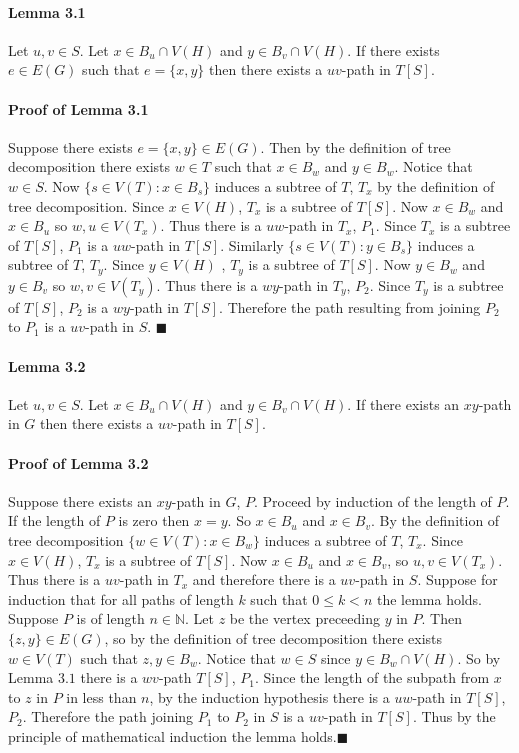 \documentclass[letterpaper,12pt,oneside,onecolumn]{report}
\begin{document}
\paragraph{Lemma 3.1}
Let $u, v \in S$. Let $x \in B_u \cap V(H)$ and $y \in B_v \cap V(H)$. If there exists $e \in E(G)$ such that $e = \{x,y\}$ then there exists a $uv$-path in $T[S]$.
\paragraph{Proof of Lemma 3.1}
Suppose there exists $e=\{x,y\} \in E(G)$. Then by the definition of tree decomposition there exists $w \in T$ such that $x \in B_w$ and $y \in B_w$. Notice that $w \in S$. Now $\{ s \in V(T) : x \in B_s \}$ induces a subtree of $T$, $T_x$ by the definition of tree decomposition. Since $x \in V(H)$, $T_x$ is a subtree of $T[S]$. Now $x \in B_w$ and $x \in B_u$ so $w,u \in V(T_x)$. Thus there is a $uw$-path in $T_x$, $P_1$. Since $T_x$ is a subtree of $T[S]$, $P_1$ is a $uw$-path in $T[S]$. Similarly $\{s \in V(T) : y \in B_s \}$ induces a subtree of $T$, $T_y$. Since $y \in V(H)$ , $T_y$ is a subtree of $T[S]$. Now $y \in B_w$ and $y \in B_v$ so $w,v \in V(T_y)$. Thus there is a $wy$-path in $T_y$, $P_2$. Since $T_y$ is a subtree of $T[S]$, $P_2$ is a $wy$-path in $T[S]$. Therefore the path resulting from joining $P_2$ to $P_1$ is a $uv$-path in $S$. $\blacksquare$
\paragraph{Lemma 3.2}
Let $u, v \in S$. Let $x \in B_u \cap V(H)$ and $y \in B_v \cap V(H)$. If there exists an $xy$-path in $G$ then there exists a $uv$-path in $T[S]$.
\paragraph{Proof of Lemma 3.2}
Suppose there exists an $xy$-path in $G$, $P$. Proceed by induction of the length of $P$. If the length of $P$ is zero then $x=y$. So $x \in B_u$ and $x \in B_v$. By the definition of tree decomposition $\{w \in V(T) : x \in B_w \}$ induces a subtree of $T$, $T_x$. Since $x \in V(H)$, $T_x$ is a subtree of $T[S]$. Now $x \in B_u$ and $x \in B_v$, so $u, v \in V(T_x)$. Thus there is a $uv$-path in $T_x$ and therefore there is a $uv$-path in $S$. Suppose for induction that for all paths of length $k$ such that $0\leq k < n$ the lemma holds. Suppose $P$ is of length $n \in \mathbb{N}$. Let $z$ be the vertex preceeding $y$ in $P$. Then $\{z,y\} \in E(G)$, so by the definition of tree decomposition there exists $w \in V(T)$ such that $z,y \in B_w$. Notice that $w \in S$ since $y \in B_w \cap V(H)$. So by Lemma $3.1$ there is a $wv$-path $T[S]$, $P_1$. Since the length of the subpath from $x$ to $z$ in $P$ in less than $n$, by the induction hypothesis there is a $uw$-path in $T[S]$, $P_2$. Therefore the path joining $P_1$ to $P_2$ in $S$ is a $uv$-path in $T[S]$. Thus by the principle of mathematical induction the lemma holds.$\blacksquare$
\end{document}

